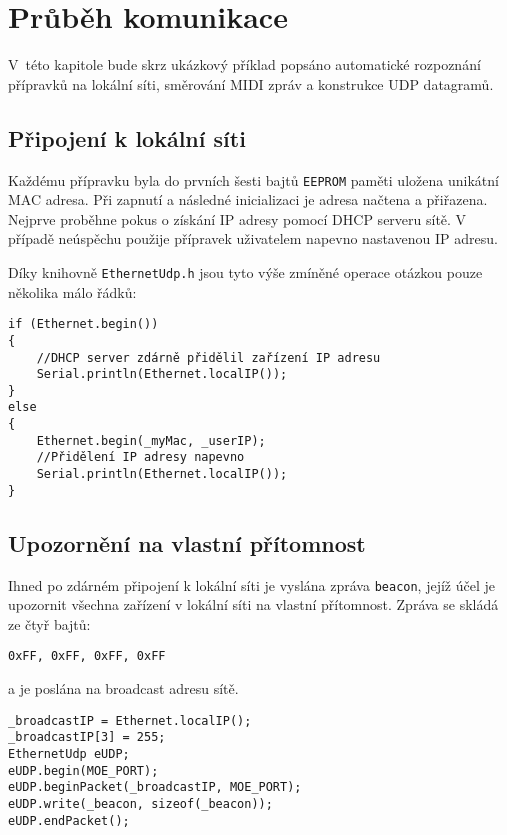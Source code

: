 \chapter{Průběh komunikace}
V~této kapitole bude skrz ukázkový příklad popsáno automatické rozpoznání přípravků na lokální síti, směrování \acs{MIDI} zpráv a konstrukce UDP datagramů.

\section{Připojení k lokální síti}
Každému přípravku byla do prvních šesti bajtů \texttt{EEPROM} paměti uložena unikátní MAC adresa. Při zapnutí a následné inicializaci je adresa načtena a přiřazena. Nejprve proběhne pokus o získání IP adresy pomocí DHCP serveru sítě. V případě neúspěchu použije přípravek uživatelem napevno nastavenou IP adresu. 

Díky knihovně \texttt{EthernetUdp.h} jsou tyto výše zmíněné operace otázkou pouze několika málo řádků:
\begin{lstlisting}
if (Ethernet.begin())
{
    //DHCP server zdárně přidělil zařízení IP adresu
    Serial.println(Ethernet.localIP());
}
else
{
    Ethernet.begin(_myMac, _userIP);
    //Přidělení IP adresy napevno
    Serial.println(Ethernet.localIP());
}
\end{lstlisting}


\newcommand{\bytes}[4]{
    \begin{center}
        \large{\texttt{0x#1, 0x#2, 0x#3, 0x#4}}
    \end{center}
}



\section{Upozornění na vlastní přítomnost}
Ihned po zdárném připojení k lokální síti je vyslána zpráva  \texttt{beacon}, jejíž účel je upozornit všechna zařízení v lokální síti na vlastní přítomnost. Zpráva se skládá ze čtyř bajtů:
\bytes{FF}{FF}{FF}{FF}
a je poslána na broadcast adresu sítě.

\begin{lstlisting}
_broadcastIP = Ethernet.localIP();
_broadcastIP[3] = 255;
EthernetUdp eUDP;
eUDP.begin(MOE_PORT);
eUDP.beginPacket(_broadcastIP, MOE_PORT);
eUDP.write(_beacon, sizeof(_beacon));
eUDP.endPacket();
\end{lstlisting}

